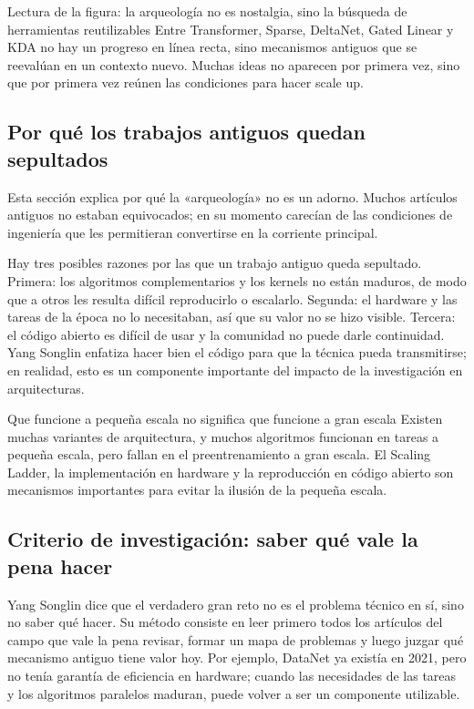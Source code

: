 \documentclass[a4paper]{article}
\begin{document}
\begin{knowledgebox}{Lectura de la figura: la arqueología no es nostalgia, sino la búsqueda de herramientas reutilizables}
Entre Transformer, Sparse, DeltaNet, Gated Linear y KDA no hay un progreso en línea recta, sino mecanismos antiguos que se reevalúan en un contexto nuevo. Muchas ideas no aparecen por primera vez, sino que por primera vez reúnen las condiciones para hacer scale up.
\end{knowledgebox}

\subsection{Por qué los trabajos antiguos quedan sepultados}

Esta sección explica por qué la «arqueología» no es un adorno. Muchos artículos antiguos no estaban equivocados; en su momento carecían de las condiciones de ingeniería que les permitieran convertirse en la corriente principal.

Hay tres posibles razones por las que un trabajo antiguo queda sepultado. Primera: los algoritmos complementarios y los kernels no están maduros, de modo que a otros les resulta difícil reproducirlo o escalarlo. Segunda: el hardware y las tareas de la época no lo necesitaban, así que su valor no se hizo visible. Tercera: el código abierto es difícil de usar y la comunidad no puede darle continuidad. Yang Songlin enfatiza hacer bien el código para que la técnica pueda transmitirse; en realidad, esto es un componente importante del impacto de la investigación en arquitecturas.

\begin{warningbox}{Que funcione a pequeña escala no significa que funcione a gran escala}
Existen muchas variantes de arquitectura, y muchos algoritmos funcionan en tareas a pequeña escala, pero fallan en el preentrenamiento a gran escala. El Scaling Ladder, la implementación en hardware y la reproducción en código abierto son mecanismos importantes para evitar la ilusión de la pequeña escala.
\end{warningbox}

\subsection{Criterio de investigación: saber qué vale la pena hacer}

Yang Songlin dice que el verdadero gran reto no es el problema técnico en sí, sino no saber qué hacer. Su método consiste en leer primero todos los artículos del campo que vale la pena revisar, formar un mapa de problemas y luego juzgar qué mecanismo antiguo tiene valor hoy. Por ejemplo, DataNet ya existía en 2021, pero no tenía garantía de eficiencia en hardware; cuando las necesidades de las tareas y los algoritmos paralelos maduran, puede volver a ser un componente utilizable.
\end{document}
